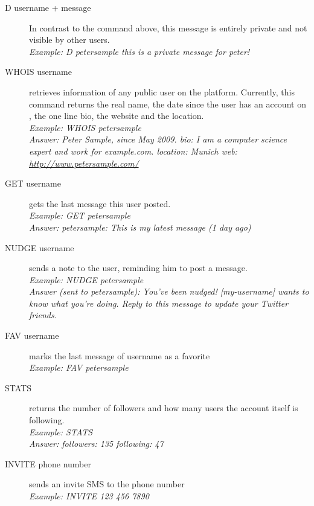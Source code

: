 \begin{description}
\begin{description}
    \item[D username + message]
      In contrast to the command above, this message is entirely private and
      not visible by other users.\\
      \textit{Example: D petersample this is a private message for peter!}

    \item[WHOIS username]
      retrieves information of any public user on the \Twitter{} platform.
      Currently, this command returns the real name, the date since the user
      has an account on \Twitter{}, the one line bio, the website and the
      location.\\
      \textit{Example: WHOIS petersample}\\
      \textit{Answer: Peter Sample, since May 2009. bio: I am a computer
              science expert and work for example.com. location: Munich web:
              \url{http://www.petersample.com/}}

    \item[GET username]
      gets the last message this user posted.\\
      \textit{Example: GET petersample}\\
      \textit{Answer: petersample: This is my latest message (1 day ago)}

    \item[NUDGE username]
      sends a note to the user, reminding him to post a message.\\
      \textit{Example: NUDGE petersample}\\
      \textit{Answer (sent to petersample): You've been nudged! [my-username] wants to know what you're doing. Reply to this
      message to update your Twitter friends.}

    \item[FAV username]
      marks the last message of username as a favorite\\
      \textit{Example: FAV petersample}

    \item[STATS]
      returns the number of followers and how many users the account itself is
      following.\\
      \textit{Example: STATS}\\
      \textit{Answer: followers: 135 following: 47}

    \item[INVITE phone number]
      sends an invite SMS to the phone number\\
      \textit{Example: INVITE 123 456 7890}

\end{description}
\end{description}



